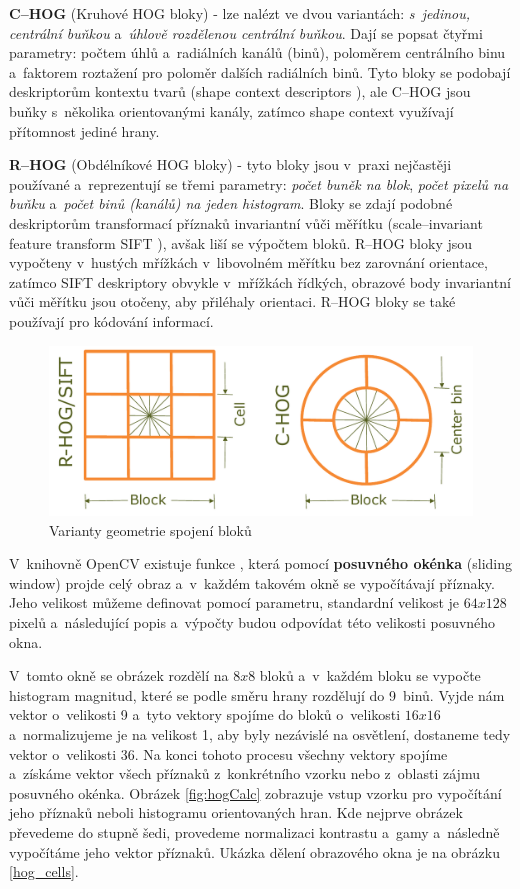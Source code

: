 \textbf{C--HOG} (Kruhové HOG bloky) - lze nalézt ve dvou variantách: \textit{s~jedinou, centrální buňkou} a~\textit{úhlově rozdělenou centrální buňkou}. Dají se popsat čtyřmi parametry: počtem úhlů a~radiálních kanálů (binů), poloměrem centrálního binu a~faktorem roztažení pro poloměr dalších radiálních binů.  Tyto bloky se podobají deskriptorům kontextu tvarů (shape context descriptors \cite{shapeContext}), ale C--HOG jsou buňky s~několika orientovanými kanály, zatímco shape context využívají přítomnost jediné hrany.

\textbf{R--HOG} (Obdélníkové HOG bloky) - tyto bloky jsou v~praxi nejčastěji používané a~reprezentují se třemi parametry: \textit{počet buněk na blok}, \textit{počet pixelů na buňku} a~\textit{počet binů (kanálů) na jeden histogram}. Bloky se zdají podobné deskriptorům transformací příznaků invariantní vůči měřítku (scale--invariant feature transform SIFT \cite{siftPaper}), avšak liší se výpočtem bloků. R--HOG bloky jsou vypočteny v~hustých mřížkách v~libovolném měřítku bez zarovnání orientace, zatímco SIFT deskriptory obvykle v~mřížkách řídkých, obrazové body invariantní vůči měřítku jsou otočeny, aby přiléhaly orientaci. R--HOG bloky se také používají pro kódování informací. 
\begin{figure}[H]
  \centering
  \includegraphics[width=14cm]{figures/hog_variants.pdf}
  \caption{Varianty geometrie spojení bloků \cite{hog:dalal}}
  \label{variants_block}
\end{figure}
V~knihovně OpenCV existuje funkce , která pomocí \textbf{posuvného okénka} (sliding window) projde celý obraz a~v~každém takovém okně se vypočítávají příznaky. Jeho velikost můžeme definovat pomocí parametru, standardní velikost je $64x128$ pixelů a~následující popis a~výpočty budou odpovídat této velikosti posuvného okna.  

V~tomto okně se obrázek rozdělí na $8x8$ bloků a~v~každém bloku se vypočte histogram magnitud, které se podle směru hrany rozdělují do 9~binů. Vyjde nám vektor o~velikosti 9 a~tyto vektory spojíme do bloků o~velikosti $16x16$ a~normalizujeme je na velikost 1, aby byly nezávislé na osvětlení, dostaneme tedy vektor o~velikosti 36. Na konci tohoto procesu všechny vektory spojíme a~získáme vektor všech příznaků z~konkrétního vzorku nebo z~oblasti zájmu posuvného okénka. Obrázek \ref{fig:hogCalc} zobrazuje vstup vzorku pro vypočítání jeho příznaků neboli histogramu orientovaných hran. Kde nejprve obrázek převedeme do stupně šedi, provedeme normalizaci kontrastu a~gamy a~následně vypočítáme jeho vektor příznaků.
Ukázka dělení obrazového okna je na obrázku \ref{hog_cells}.

